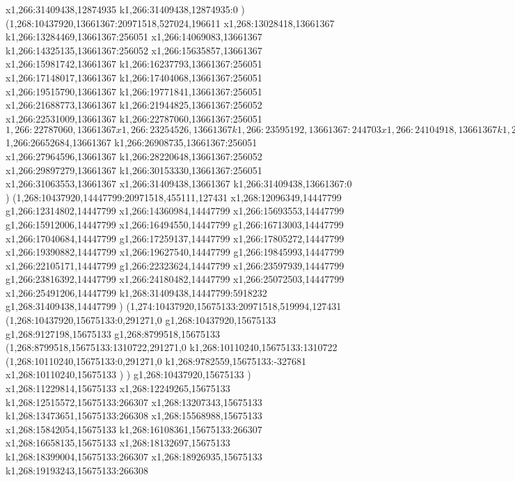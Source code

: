 {x1,266:31409438,12874935
k1,266:31409438,12874935:0
)
(1,268:10437920,13661367:20971518,527024,196611
x1,268:13028418,13661367
k1,266:13284469,13661367:256051
x1,266:14069083,13661367
k1,266:14325135,13661367:256052
x1,266:15635857,13661367
x1,266:15981742,13661367
k1,266:16237793,13661367:256051
x1,266:17148017,13661367
k1,266:17404068,13661367:256051
x1,266:19515790,13661367
k1,266:19771841,13661367:256051
x1,266:21688773,13661367
k1,266:21944825,13661367:256052
x1,266:22531009,13661367
k1,266:22787060,13661367:256051
$1,266:22787060,13661367
x1,266:23254526,13661367
k1,266:23595192,13661367:244703
x1,266:24104918,13661367
k1,266:24349620,13661367:244702
(1,266:24349620,13169843:618953,0,655368
x1,266:24968573,13169843
)
[1,266:24968573,13857978:881743,723635,0
(1,266:24968573,13331861:356734,197518,0
x1,266:25292539,13331861
)
(1,266:24968573,13857978:881743,303558,0
x1,266:25817548,13857978
)
]
k1,266:25959540,13661367:109224
x1,266:26434496,13661367
(1,266:26434496,13759670:218188,303558,0
x1,266:26619916,13759670
)
$1,266:26652684,13661367
k1,266:26908735,13661367:256051
x1,266:27964596,13661367
k1,266:28220648,13661367:256052
x1,266:29897279,13661367
k1,266:30153330,13661367:256051
x1,266:31063553,13661367
x1,266:31409438,13661367
k1,266:31409438,13661367:0
)
(1,268:10437920,14447799:20971518,455111,127431
x1,268:12096349,14447799
g1,266:12314802,14447799
x1,266:14360984,14447799
x1,266:15693553,14447799
g1,266:15912006,14447799
x1,266:16494550,14447799
g1,266:16713003,14447799
x1,266:17040684,14447799
g1,266:17259137,14447799
x1,266:17805272,14447799
x1,266:19390882,14447799
x1,266:19627540,14447799
g1,266:19845993,14447799
x1,266:22105171,14447799
g1,266:22323624,14447799
x1,266:23597939,14447799
g1,266:23816392,14447799
x1,266:24180482,14447799
x1,266:25072503,14447799
x1,266:25491206,14447799
k1,268:31409438,14447799:5918232
g1,268:31409438,14447799
)
(1,274:10437920,15675133:20971518,519994,127431
(1,268:10437920,15675133:0,291271,0
g1,268:10437920,15675133
g1,268:9127198,15675133
g1,268:8799518,15675133
(1,268:8799518,15675133:1310722,291271,0
k1,268:10110240,15675133:1310722
(1,268:10110240,15675133:0,291271,0
k1,268:9782559,15675133:-327681
x1,268:10110240,15675133
)
)
g1,268:10437920,15675133
)
x1,268:11229814,15675133
x1,268:12249265,15675133
k1,268:12515572,15675133:266307
x1,268:13207343,15675133
k1,268:13473651,15675133:266308
x1,268:15568988,15675133
x1,268:15842054,15675133
k1,268:16108361,15675133:266307
x1,268:16658135,15675133
x1,268:18132697,15675133
k1,268:18399004,15675133:266307
x1,268:18926935,15675133
k1,268:19193243,15675133:266308
}

